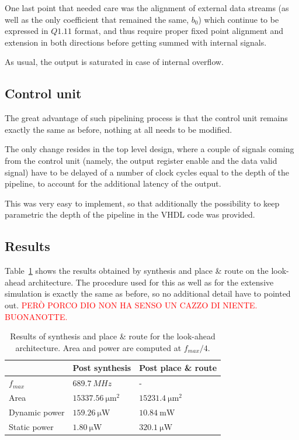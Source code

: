\documentclass[a4paper]{article}
\begin{document}
One last point that needed care was the alignment of external data streams (as well as the only coefficient that remained the same, $b_0$) which continue to be expressed in $Q1.11$ format, and thus require proper fixed point alignment and extension in both directions before getting summed with internal signals. 

As usual, the output is saturated in case of internal overflow.

\subsection{Control unit}
The great advantage of such pipelining process is that the control unit remains exactly the same as before, nothing at all needs to be modified.

The only change resides in the top level design, where a couple of signals coming from the control unit (namely, the output register enable and the data valid signal) have to be delayed of a number of clock cycles equal to the depth of the pipeline, to account for the additional latency of the output. 

This was very easy to implement, so that additionally the possibility to keep parametric the depth of the pipeline in the VHDL code was provided.

\subsection{Results}
Table~\ref{tab:lookahead} shows the results obtained by synthesis and place \& route on the look-ahead architecture. The procedure used for this as well as for the extensive simulation is exactly the same as before, so no additional detail have to pointed out.
\textcolor{red}{PERÒ PORCO DIO NON HA SENSO UN CAZZO DI NIENTE. BUONANOTTE.}

\begin{table}[hbtp]
    \centering
    \begin{tabular}{l|l|l|}
    \cline{2-3}
                                        & Post synthesis                  & Post place \& route            \\ \hline
    \multicolumn{1}{|l|}{$f_{max}$}     & $\SI{689.7}{MHz}$               & -                              \\ \hline
    \multicolumn{1}{|l|}{Area}          & $\SI{15337.56}{\micro\meter^2}$ & $\SI{15231.4}{\micro\meter^2}$ \\ \hline
    \multicolumn{1}{|l|}{Dynamic power} & $\SI{159.26}{\micro\watt}$      & $\SI{10.84}{\milli\watt}$      \\ \hline
    \multicolumn{1}{|l|}{Static power}  & $\SI{1.80}{\micro\watt}$        & $\SI{320.1}{\micro\watt}$      \\ \hline
    \end{tabular}
    \caption{Results of synthesis and place \& route for the look-ahead architecture. Area and power are computed at $f_{max}/4$.}
    \label{tab:lookahead}
\end{table}
\end{document}
